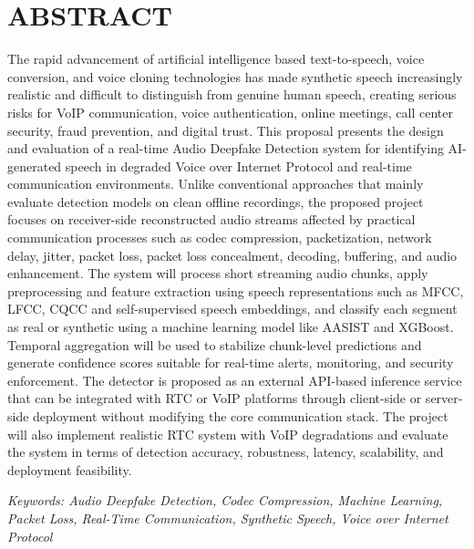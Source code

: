 \newpage
\section*{ABSTRACT}  
{}

The rapid advancement of artificial intelligence based text-to-speech, voice conversion, and voice cloning technologies has made synthetic speech increasingly realistic and difficult to distinguish from genuine human speech, creating serious risks for VoIP communication, voice authentication, online meetings, call center security, fraud prevention, and digital trust. This proposal presents the design and evaluation of a real-time Audio Deepfake Detection system for identifying AI-generated speech in degraded Voice over Internet Protocol and real-time communication environments. Unlike conventional approaches that mainly evaluate detection models on clean offline recordings, the proposed project focuses on receiver-side reconstructed audio streams affected by practical communication processes such as codec compression, packetization, network delay, jitter, packet loss, packet loss concealment, decoding, buffering, and audio enhancement. The system will process short streaming audio chunks, apply preprocessing and feature extraction using speech representations such as MFCC, LFCC, CQCC and self-supervised speech embeddings, and classify each segment as real or synthetic using a machine learning model like AASIST and XGBoost. Temporal aggregation will be used to stabilize chunk-level predictions and generate confidence scores suitable for real-time alerts, monitoring, and security enforcement. The detector is proposed as an external API-based inference service that can be integrated with RTC or VoIP platforms through client-side or server-side deployment without modifying the core communication stack. The project will also implement realistic RTC system with VoIP degradations and evaluate the system in terms of detection accuracy, robustness, latency, scalability, and deployment feasibility.

\vspace{0.5cm}

\textit{Keywords: Audio Deepfake Detection, Codec Compression, Machine Learning, Packet Loss, Real-Time Communication, Synthetic Speech, Voice over Internet Protocol}